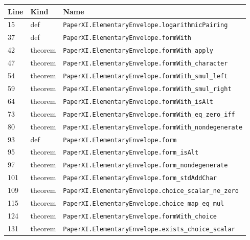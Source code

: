 \documentclass[10pt,oneside]{book}
\begin{document}
\begin{longtable}{@{}p{}p{}p{}@{}}\toprule Line&Kind&Name\\\midrule\endhead

15&def&\nolinkurl{PaperXI.ElementaryEnvelope.logarithmicPairing}\\

37&def&\nolinkurl{PaperXI.ElementaryEnvelope.formWith}\\

42&theorem&\nolinkurl{PaperXI.ElementaryEnvelope.formWith_apply}\\

47&theorem&\nolinkurl{PaperXI.ElementaryEnvelope.formWith_character}\\

54&theorem&\nolinkurl{PaperXI.ElementaryEnvelope.formWith_smul_left}\\

59&theorem&\nolinkurl{PaperXI.ElementaryEnvelope.formWith_smul_right}\\

64&theorem&\nolinkurl{PaperXI.ElementaryEnvelope.formWith_isAlt}\\

73&theorem&\nolinkurl{PaperXI.ElementaryEnvelope.formWith_eq_zero_iff}\\

80&theorem&\nolinkurl{PaperXI.ElementaryEnvelope.formWith_nondegenerate}\\

93&def&\nolinkurl{PaperXI.ElementaryEnvelope.form}\\

95&theorem&\nolinkurl{PaperXI.ElementaryEnvelope.form_isAlt}\\

97&theorem&\nolinkurl{PaperXI.ElementaryEnvelope.form_nondegenerate}\\

101&theorem&\nolinkurl{PaperXI.ElementaryEnvelope.form_stdAddChar}\\

109&theorem&\nolinkurl{PaperXI.ElementaryEnvelope.choice_scalar_ne_zero}\\

115&theorem&\nolinkurl{PaperXI.ElementaryEnvelope.choice_map_eq_mul}\\

124&theorem&\nolinkurl{PaperXI.ElementaryEnvelope.formWith_choice}\\

131&theorem&\nolinkurl{PaperXI.ElementaryEnvelope.exists_choice_scalar}\\

\bottomrule\end{longtable}
\end{document}
